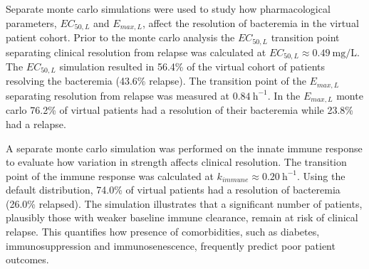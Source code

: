 \documentclass[12pt, draftcls, onecolumn]{IEEEtran}
\begin{document}
Separate monte carlo simulations were used to study how pharmacological parameters, $EC_{50,L}$ and $E_{max,L}$, affect the resolution of bacteremia in the virtual patient cohort.  Prior to the monte carlo analysis the $EC_{50,L}$ transition point separating clinical resolution from relapse was calculated at  $EC_{50,L} \approx 0.49~\mathrm{mg/L}$.  The $EC_{50,L}$ simulation resulted in 56.4\% of the virtual cohort of patients resolving the bacteremia (43.6\% relapse).   The transition point of the $E_{max,L}$ separating resolution from relapse was measured at $0.84~\mathrm{h}^{-1}$.  In the $E_{max,L}$ monte carlo 76.2\% of virtual patients had a resolution of their bacteremia while 23.8\% had a relapse.  


A separate monte carlo simulation was performed on the innate immune response to evaluate how variation in strength affects clinical resolution. The  transition point of the immune response was calculated at $k_{immune} \approx
0.20~\mathrm{h}^{-1}$.  Using the default distribution, 74.0\% of virtual patients had a resolution of bacteremia (26.0\% relapsed).  The simulation illustrates that a significant number of patients, plausibly those with weaker
baseline immune clearance, remain at risk of clinical relapse. This 
quantifies how presence of comorbidities, such as diabetes, immunosuppression and immunosenescence, frequently predict poor patient outcomes.
\end{document}

